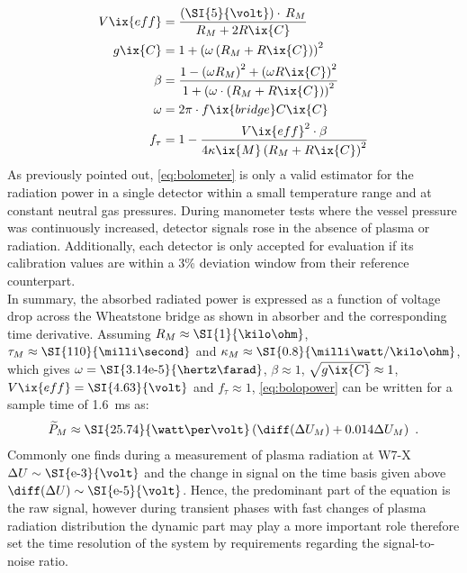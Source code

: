 %
                \begin{align}
                    \begin{split}\label{eq:bolometer_variables}
                        V\ix{eff}&=\frac{\left(\text{\SI{5}{\volt}}\right)\cdot\,R_{M}}{R_{M}+2R\ix{C}}\\%
                        g\ix{C}&=1+\left(\omega\left(R_{M}+R\ix{C}\right)\right)^{2}\\%
                        \beta&=\frac{1-\left(\omega R_{M}\right)^{2}+\left(\omega R\ix{C}\right)^{2}}{1+\left(\omega\cdot\left(R_{M}+R\ix{C}\right)\right)^{2}}\\%
                        \omega&=2\pi\cdot f\ix{bridge}C\ix{C}\\%
                        f_\tau&=1-\frac{V\ix{eff}^{2}\cdot\beta}{4\kappa\ix{M}\left(R_{M}+R\ix{C}\right)^{2}}%
                    \end{split}
                \end{align}
%
                As previously pointed out, \cref{eq:bolometer} is only a valid estimator for the radiation power in a single detector within a small temperature range and at constant neutral gas pressures. During manometer tests where the vessel pressure was continuously increased, detector signals rose in the absence of plasma or radiation. Additionally, each detector is only accepted for evaluation if its calibration values are within a 3\% deviation window from their reference counterpart.\\%
                In summary, the absorbed radiated power is expressed as a function of voltage drop across the Wheatstone bridge as shown in absorber and the corresponding time derivative. Assuming $R_{M}\approx\text{\SI{1}{\kilo\ohm}}$, $\tau_{M}\approx\text{\SI{110}{\milli\second}}$ and $\kappa_{M}\approx\text{\SI{0.8}{\milli\watt/\kilo\ohm}}$, which gives $\omega=\text{\SI{3.14e-5}{\hertz\farad}}$, $\beta\approx1$, $\sqrt{g\ix{C}}\approx1$, $V\ix{eff}=\text{\SI{4.63}{\volt}}$ and $f_{\tau}\approx1$, \cref{eq:bolopower} can be written for a sample time of \SI{1.6}{\milli\second} as:%
%
                \begin{align}%
                    \widetilde{P}_{M}\approx\text{\SI{25.74}{\watt\per\volt}}\left(\diff(\Delta U_{M})+0.014\Delta U_{M}\right)\,\,.\label{eq:approx}%
                \end{align}%
%
                Commonly one finds during a measurement of plasma radiation at W7-X $\Delta U\sim\text{\SI{e-3}{\volt}}$ and the change in signal on the time basis given above $\diff(\Delta U)\sim\text{\SI{e-5}{\volt}}$. Hence, the predominant part of the equation is the raw signal, however during transient phases with fast changes of plasma radiation distribution the dynamic part may play a more important role therefore set the time resolution of the system by requirements regarding the signal-to-noise ratio.\\%
